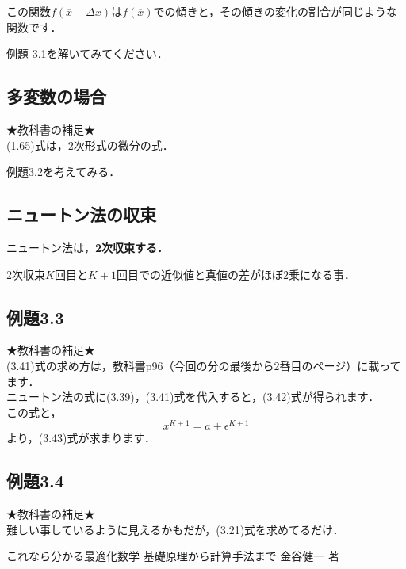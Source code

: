 \documentclass[11pt,a4paper]{jsarticle}
\newcommand{\itemb}[2]{\begin{itembox}[l]{#1}$#2$\end{itembox}}
\newcommand{\ov}[1]{\overline{#1}}
\newcommand{\eq}[1]{ \begin{equation}#1 \end{equation}}
\begin{document}
この関数$f(\ov{x}+\Delta x) $は$f(\ov{x}) $での傾きと，その傾きの変化の割合が同じような関数です．

例題 3.1を解いてみてください．

\subsection{多変数の場合}
★教科書の補足★\\
(1.65)式は，2次形式の微分の式．

例題3.2を考えてみる．

\subsection{ニュートン法の収束}

ニュートン法は，\bf{2次収束}する．
\itemb{2次収束}{
	K回目とK+1回目での近似値と真値の差がほぼ2乗になる事．
}
\subsection{例題3.3}
★教科書の補足★\\
(3.41)式の求め方は，教科書p96（今回の分の最後から2番目のページ）に載ってます．\\
ニュートン法の式に(3.39)，(3.41)式を代入すると，(3.42)式が得られます．\\
この式と，
\eq{
	x^{K+1} = a + \epsilon^{K+1}   
}
より，(3.43)式が求まります．
\subsection{例題3.4}
★教科書の補足★\\
難しい事しているように見えるかもだが，(3.21)式を求めてるだけ．
\begin{thebibliography}{n}
 これなら分かる最適化数学 基礎原理から計算手法まで 金谷健一 著
\end{thebibliography}
\end{document}
